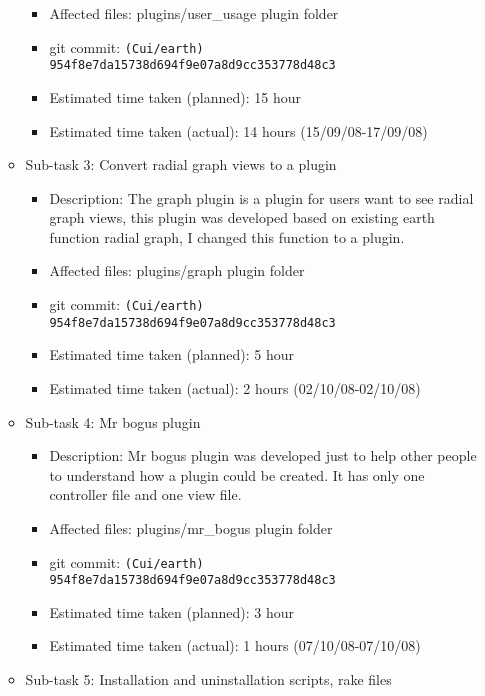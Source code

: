 \begin{itemize}
\begin{itemize}
\begin{itemize}
                    \item Affected files: plugins/user\_usage plugin folder
                    \item git commit: \texttt{(Cui/earth) 954f8e7da15738d694f9e07a8d9cc353778d48c3}
                    \item Estimated time taken (planned): 15 hour
                    \item Estimated time taken (actual): 14 hours (15/09/08-17/09/08)
                \end{itemize}
            \item Sub-task 3: Convert radial graph views to a plugin
                \begin{itemize}
                    \item Description: The graph plugin is a plugin for users want to see radial graph views, this plugin was developed based on existing earth function radial graph, I changed this function to a plugin.
                    \item Affected files: plugins/graph plugin folder
                    \item git commit: \texttt{(Cui/earth) 954f8e7da15738d694f9e07a8d9cc353778d48c3}
                    \item Estimated time taken (planned): 5 hour
                    \item Estimated time taken (actual): 2 hours (02/10/08-02/10/08)
                \end{itemize}
            \item Sub-task 4: Mr bogus plugin
                \begin{itemize}
                    \item Description: Mr bogus plugin was developed just to help other people to understand how a plugin could be created. It has only one controller file and one view file.
                    \item Affected files: plugins/mr\_bogus plugin folder
                    \item git commit: \texttt{(Cui/earth) 954f8e7da15738d694f9e07a8d9cc353778d48c3}
                    \item Estimated time taken (planned): 3 hour
                    \item Estimated time taken (actual): 1 hours (07/10/08-07/10/08)
                \end{itemize}
            \item Sub-task 5: Installation and uninstallation scripts, rake files

\end{itemize}
\end{itemize}
